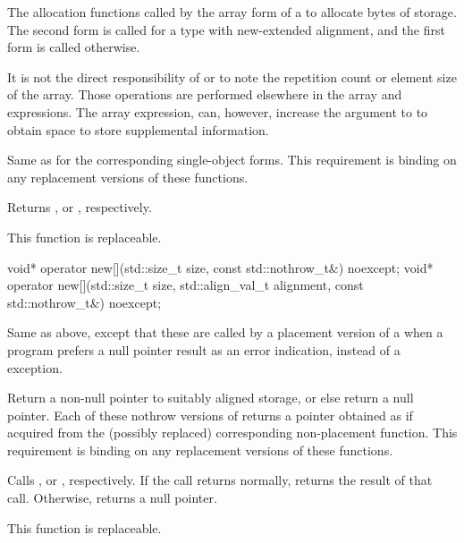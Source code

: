 \begin{itemdescr}
\pnum
\effects
The
allocation functions
called by the array form of a
to allocate
 bytes of storage.
The second form is called for a type with new-extended alignment, and
the first form is called otherwise.
\begin{footnote}
It is not the direct responsibility of
or
to note the repetition count or element size of the array.
Those operations are performed elsewhere in the array
and
expressions.
The array
expression, can, however, increase the  argument to
to obtain space to store supplemental information.
\end{footnote}

\pnum
\required
Same as for
the corresponding single-object forms.
This requirement is binding on any replacement versions of these functions.

\pnum
{}
Returns
,
or
,
respectively.

\pnum
\remarks
This function is replaceable.
\end{itemdescr}

%
\begin{itemdecl}
void* operator new[](std::size_t size, const std::nothrow_t&) noexcept;
void* operator new[](std::size_t size, std::align_val_t alignment, const std::nothrow_t&) noexcept;
\end{itemdecl}

\begin{itemdescr}
\pnum
\effects
Same as above, except that these are called by a placement version of a
when a \Cpp{} program prefers a null pointer result as an error indication,
instead of a
exception.

\pnum
\required
Return a non-null pointer to suitably aligned storage,
or else return a null pointer.
Each of these nothrow versions of
returns a pointer obtained as if
acquired from the (possibly replaced)
corresponding non-placement function.
This requirement is binding on any replacement versions of these functions.

\pnum
{}
Calls ,
or ,
respectively.
If the call returns normally,
returns the result of that call.
Otherwise, returns a null pointer.

\pnum
\remarks
This function is replaceable.
\end{itemdescr}

